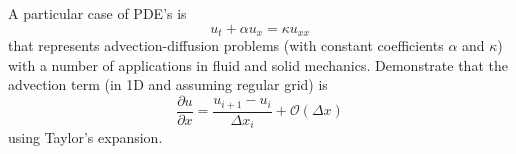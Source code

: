 \documentclass[calculator,datasheet,resit]{exam}
\newcommand{\frc}{\displaystyle\frac}
\begin{document}
\clearpage

\begin{question}
 A particular case of PDE's is
\begin{displaymath}
u_{t}+\alpha u_{x} = \kappa u_{xx}
\end{displaymath}
that represents advection-diffusion problems (with constant coefficients $\alpha$ and $\kappa$) with a number of applications in fluid and solid mechanics. Demonstrate that the advection term (in 1D and assuming regular grid) is
\begin{displaymath}
\frc{\partial u}{\partial x}=\frc{u_{i+1}-u_{i}}{\Delta x_{i}} + \mathcal{O}\left(\Delta x\right)
\end{displaymath}
using Taylor's expansion.~
\end{question}


\vfill


\paperend
\end{document}
